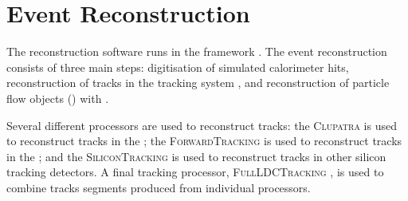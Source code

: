 

\section{Event Reconstruction}

The reconstruction software runs in the \Marlin framework \cite{Gaede:2006pj}. The event reconstruction consists of three main steps: digitisation of simulated calorimeter hits, reconstruction of tracks in the tracking system \cite{Gaede:2014aza}, and reconstruction of particle flow objects (\PFOs) with \pandora\cite{Thomson:2009rp,Marshall:2012ry}.


Several different \Marlin processors are used to reconstruct tracks: the \textsc{Clupatra} \cite{Gaede:2014aza} is used to reconstruct tracks in the \TPC; the \textsc{ForwardTracking} \cite{Gaede:2014aza} is used to reconstruct tracks in the \FTD; and the \textsc{SiliconTracking} \cite{Gaede:2014aza} is used to reconstruct tracks in other silicon tracking detectors. A final \Marlin tracking processor, \textsc{FullLDCTracking} \cite{Gaede:2014aza}, is used to combine tracks segments produced from individual processors.



